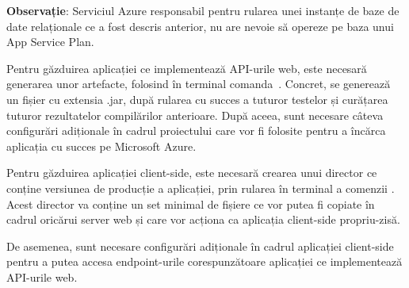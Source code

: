 \textbf{Observație}: Serviciul Azure responsabil pentru rularea unei instanțe de baze de date relaționale ce a fost descris anterior, nu are nevoie să opereze pe baza unui App Service Plan.\newline

Pentru găzduirea aplicației ce implementează API-urile web, este necesară generarea unor artefacte, folosind în terminal comanda \,. Concret, se generează un fișier cu extensia .jar, după rularea cu succes a tuturor testelor și curățarea tuturor rezultatelor compilărilor anterioare. După aceea, sunt necesare câteva configurări adiționale în cadrul proiectului care vor fi folosite pentru a încărca aplicația cu succes pe Microsoft Azure.\newline

Pentru găzduirea aplicației client-side, este necesară crearea unui director ce conține versiunea de producție a aplicației, prin rularea în terminal a comenzii . Acest director va conține un set minimal de fișiere ce vor putea fi copiate în cadrul oricărui server web și care vor acționa ca aplicația client-side propriu-zisă.\newline

De asemenea, sunt necesare configurări adiționale în cadrul aplicației client-side pentru a putea accesa endpoint-urile corespunzătoare aplicației ce implementează API-urile web.

\label{chap:03}